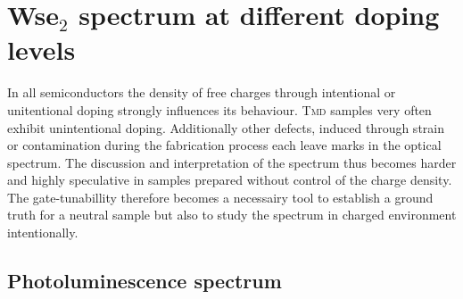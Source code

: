 \section{Ws\textup{e}$_2$ spectrum at different doping levels}

In all semiconductors the density of free charges through intentional or unitentional doping strongly influences its behaviour. \textsc{Tmd} samples very often exhibit unintentional doping. Additionally other defects, induced through strain or contamination during the fabrication process each leave marks in the optical spectrum. The discussion and interpretation of the spectrum thus becomes harder and highly speculative in samples prepared without control of the charge density. The gate-tunabillity therefore becomes a necessairy tool to establish a ground truth for a neutral sample but also to study the spectrum in charged environment intentionally.

\subsection{Photoluminescence spectrum}

